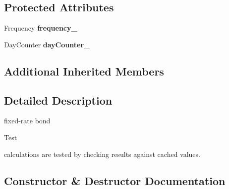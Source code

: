 \subsection*{Protected Attributes}
\begin{DoxyCompactItemize}
\item 
Frequency {\bfseries frequency\+\_\+}\label{class_quant_lib_1_1_fixed_rate_bond_a72d9eab2a7cdb6f2b90b42e8ca9674f7}

\item 
Day\+Counter {\bfseries day\+Counter\+\_\+}\label{class_quant_lib_1_1_fixed_rate_bond_aab42ac5ab053fcec9d0c46acf2b68ef4}

\end{DoxyCompactItemize}
\subsection*{Additional Inherited Members}


\subsection{Detailed Description}
fixed-\/rate bond 

\begin{DoxyRefDesc}{Test}
\item[{\bf Test}]calculations are tested by checking results against cached values. \end{DoxyRefDesc}


\subsection{Constructor \& Destructor Documentation}
